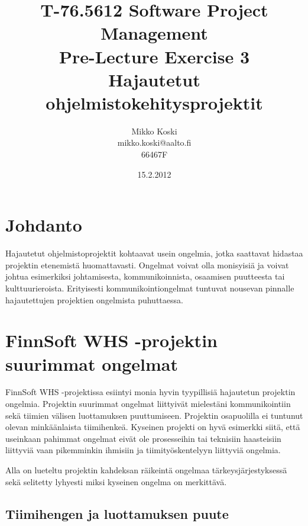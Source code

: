 \documentclass[a4paper]{article}
\begin{document}
\title{\small T-76.5612 Software Project Management \\ Pre-Lecture Exercise 3 \\ \huge Hajautetut ohjelmistokehitysprojektit}
\date{15.2.2012}
\author{Mikko Koski \\ mikko.koski@aalto.fi \\ 66467F}
\maketitle

\normalsize

\section{Johdanto}

Hajautetut ohjelmistoprojektit kohtaavat usein ongelmia, jotka saattavat hidastaa projektin etenemistä huomattavasti. Ongelmat voivat olla monisyisiä ja voivat johtua esimerkiksi johtamisesta, kommunikoinnista, osaamisen puutteesta tai kulttuurieroista. Erityisesti kommunikointiongelmat tuntuvat nousevan pinnalle hajautettujen projektien ongelmista puhuttaessa.

\section{FinnSoft WHS -projektin suurimmat ongelmat}

FinnSoft WHS -projektissa esiintyi monia hyvin tyypillisiä hajautetun projektin ongelmia. Projektin suurimmat ongelmat liittyivät mielestäni kommunikointiin sekä tiimien välisen luottamuksen puuttumiseen. Projektin osapuolilla ei tuntunut olevan minkäänlaista tiimihenkeä. Kyseinen projekti on hyvä esimerkki siitä, että useinkaan pahimmat ongelmat eivät ole prosesseihin tai teknisiin haasteisiin liittyviä vaan pikemminkin ihmisiin ja tiimityöskentelyyn liittyviä ongelmia.

Alla on lueteltu projektin kahdeksan räikeintä ongelmaa tärkeysjärjestyksessä sekä selitetty lyhyesti miksi kyseinen ongelma on merkittävä.



\subsection{Tiimihengen ja luottamuksen puute}
\end{document}

